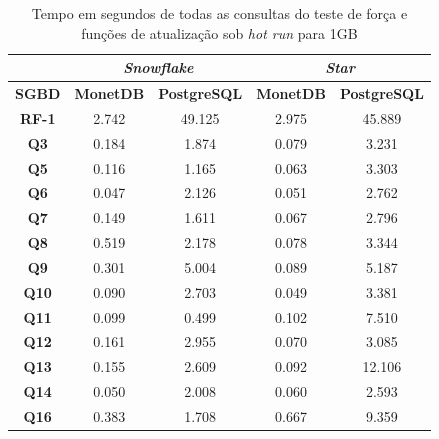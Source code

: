 \begin{table}[t]
        \centering
        \caption{Tempo em segundos de todas as consultas do teste de força e funções de atualização sob \textit{hot run} para 1GB}
        \label{tab:queries_hot_1}
        \begin{tabular}{|c|c|c|c|c|}
        \hline
        & \multicolumn{2}{c|}{\textit{\textbf{Snowflake}}} & \multicolumn{2}{c|}{\textit{\textbf{Star}}} \\ \hline
        \textbf{SGBD}  & \textbf{MonetDB}      & \textbf{PostgreSQL}      & \textbf{MonetDB}    & \textbf{PostgreSQL}   \\ \hline
        \textbf{RF-1}  & 2.742             & 49.125              & 2.975            & 45.889              \\ \hline
        \textbf{Q3}    & 0.184             & 1.874               & 0.079            & 3.231               \\ \hline
        \textbf{Q5}    & 0.116             & 1.165               & 0.063            & 3.303               \\ \hline
        \textbf{Q6}    & 0.047             & 2.126               & 0.051            & 2.762               \\ \hline
        \textbf{Q7}    & 0.149             & 1.611               & 0.067            & 2.796               \\ \hline
        \textbf{Q8}    & 0.519             & 2.178               & 0.078            & 3.344               \\ \hline
        \textbf{Q9}    & 0.301             & 5.004               & 0.089            & 5.187               \\ \hline
        \textbf{Q10}   & 0.090             & 2.703               & 0.049            & 3.381               \\ \hline
        \textbf{Q11}   & 0.099             & 0.499               & 0.102            & 7.510               \\ \hline
        \textbf{Q12}   & 0.161             & 2.955               & 0.070            & 3.085               \\ \hline
        \textbf{Q13}   & 0.155             & 2.609               & 0.092            & 12.106              \\ \hline
        \textbf{Q14}   & 0.050             & 2.008               & 0.060            & 2.593               \\ \hline
        \textbf{Q16}   & 0.383             & 1.708               & 0.667            & 9.359               \\ \hline

\end{tabular}
\end{table}
